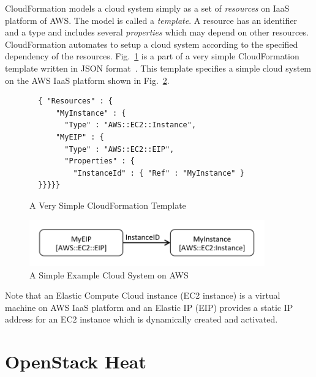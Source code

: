 \documentclass[12pt]{report}
\begin{document}
CloudFormation models a cloud system simply as a set of {\it
  resources} on IaaS platform of AWS. The model is called a {\it
  template}. A resource has an identifier and a type and includes
several {\it properties} which may depend on other
resources. CloudFormation automates to setup a cloud system according
to the specified dependency of the
resources. Fig.~\ref{fig:AWSExample} is a part of a very simple
CloudFormation template written in JSON format~\cite{JSON}.
This template specifies a simple cloud system on the AWS IaaS platform
shown in Fig.~\ref{fig:exampleaws}.
\begin{figure}
\begin{verbatim}
  { "Resources" : {
      "MyInstance" : {
        "Type" : "AWS::EC2::Instance",
      "MyEIP" : {
        "Type" : "AWS::EC2::EIP",
        "Properties" : {
          "InstanceId" : { "Ref" : "MyInstance" }
  }}}}}
\end{verbatim}
\vspace{-0.6cm}
\caption{A Very Simple CloudFormation Template}
\label{fig:AWSExample}
\end{figure}
\begin{figure}
\centering
\includegraphics[height=2cm,natwidth=396,natheight=78]{./exaws.png}
\caption{A Simple Example Cloud System on AWS}
\label{fig:exampleaws}
\end{figure}
Note that an Elastic Compute Cloud instance (EC2 instance) is a
virtual machine on AWS IaaS platform and an Elastic IP (EIP)
provides a static IP address for an EC2 instance which is dynamically
created and activated.

\section{OpenStack Heat}
\label{sec:heat}

\end{document}
